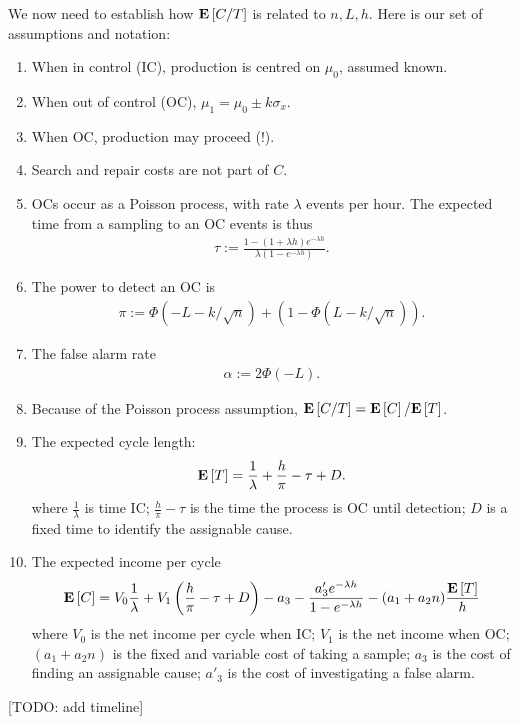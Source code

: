 \documentclass[12pt,a4paper]{report}
\theoremstyle{plain}
\theoremstyle{definition}
\newcommand{\arm}{L}
\begin{document}
We now need to establish how $\mathbf{E}\left[ C/T \right]$ is related to $n,\arm,h$. Here is our set of assumptions and notation:
\begin{enumerate}
\item When in control (IC), production is centred on $\mu_0$, assumed known. 
\item When out of control (OC), $\mu_1=\mu_0 \pm k \sigma_x$. 
\item When OC, production may proceed (!). 
\item Search and repair costs are not part of $C$.
\item OCs occur as a Poisson process, with rate $\lambda$ events per hour. The expected time from a sampling to an OC events is thus 
\begin{align}
	\tau := \frac{1-(1+ \lambda h) e^{-\lambda h}}{\lambda(1-e^{-\lambda h})}.
\end{align} 
\item The power to detect an OC is 
\begin{align}
	\pi:= \Phi(-\arm-k/\sqrt{n})+ (1-\Phi(\arm-k/\sqrt{n})).
\end{align}
\item The false alarm rate
\begin{align}
	\alpha:= 2 \Phi(-\arm).
\end{align}
\item Because of the Poisson process assumption,  $\mathbf{E}\left[ C/T \right]=\mathbf{E}\left[ C \right]/\mathbf{E}\left[ T \right]$. 
\item The expected cycle length:
\begin{align}
	\mathbf{E}\left[ T \right]= \frac{1}{\lambda}+ \frac{h}{\pi}- \tau  + D.
\end{align}
where $\frac{1}{\lambda}$ is time IC;
$\frac{h}{\pi}- \tau$ is the time the process is OC until detection;
$D$ is a fixed time to identify the assignable cause. 
\item The expected income per cycle
\begin{align*}
	\mathbf{E}\left[ C \right]= V_0 \frac{1}{\lambda} + 
	V_1 \left(\frac{h}{\pi}- \tau  + D  \right) - 
	a_3 -
	\frac{a'_3 e^{-\lambda h}}{1-e^{-\lambda h}} -
	(a_1+a_2n)\frac{\mathbf{E}\left[ T \right]}{h}
\end{align*}
where $V_0$ is the net income per cycle when IC;
$V_1$ is the net income when OC;
$(a_1+a_2n)$ is the fixed and variable cost of taking a sample;
$a_3$ is the cost of finding an assignable cause;
$a'_3$ is the cost of investigating a false alarm.
\end{enumerate}

[TODO: add timeline]
\end{document}
